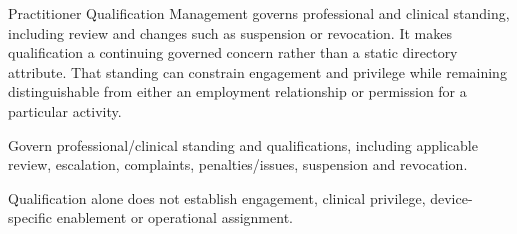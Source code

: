 Practitioner Qualification Management governs professional and clinical standing, including review and changes such as suspension or revocation. It makes qualification a continuing governed concern rather than a static directory attribute. That standing can constrain engagement and privilege while remaining distinguishable from either an employment relationship or permission for a particular activity.



Govern professional/\allowbreak{}clinical standing and qualifications, including applicable review, escalation, complaints, penalties/\allowbreak{}issues, suspension and revocation.



Qualification alone does not establish engagement, clinical privilege, device-specific enablement or operational assignment.


